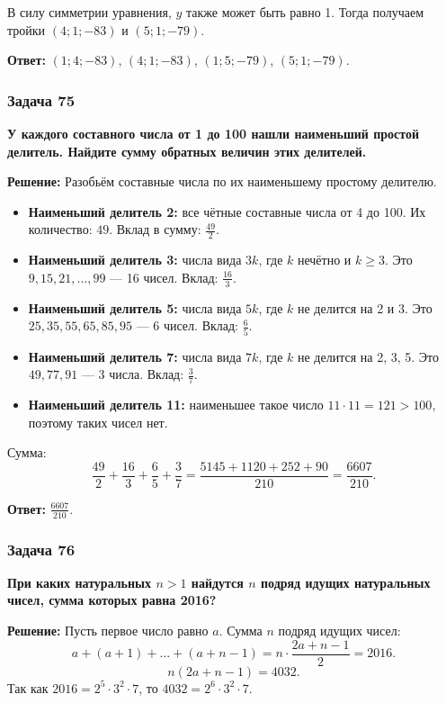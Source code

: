 \documentclass[12pt, a4paper]{article}
\begin{document}
В силу симметрии уравнения, $y$ также может быть равно 1. Тогда получаем тройки $(4; 1; -83)$ и $(5; 1; -79)$.

\textbf{Ответ:} $(1; 4; -83)$, $(4; 1; -83)$, $(1; 5; -79)$, $(5; 1; -79)$.

\subsubsection*{Задача 75}
\textbf{У каждого составного числа от 1 до 100 нашли наименьший простой делитель. Найдите сумму обратных величин этих делителей.}

\textbf{Решение:}
Разобьём составные числа по их наименьшему простому делителю.

\begin{itemize}
    \item \textbf{Наименьший делитель 2:} все чётные составные числа от 4 до 100. Их количество: $49$. Вклад в сумму: $\frac{49}{2}$.
    \item \textbf{Наименьший делитель 3:} числа вида $3k$, где $k$ нечётно и $k \ge 3$. Это $9, 15, 21, \ldots, 99$ — 16 чисел. Вклад: $\frac{16}{3}$.
    \item \textbf{Наименьший делитель 5:} числа вида $5k$, где $k$ не делится на 2 и 3. Это $25, 35, 55, 65, 85, 95$ — 6 чисел. Вклад: $\frac{6}{5}$.
    \item \textbf{Наименьший делитель 7:} числа вида $7k$, где $k$ не делится на 2, 3, 5. Это $49, 77, 91$ — 3 числа. Вклад: $\frac{3}{7}$.
    \item \textbf{Наименьший делитель 11:} наименьшее такое число $11 \cdot 11 = 121 > 100$, поэтому таких чисел нет.
\end{itemize}

Сумма:
\[
\frac{49}{2} + \frac{16}{3} + \frac{6}{5} + \frac{3}{7} = \frac{5145 + 1120 + 252 + 90}{210} = \frac{6607}{210}.
\]

\textbf{Ответ:} $\frac{6607}{210}$.

\subsubsection*{Задача 76}
\textbf{При каких натуральных $n > 1$ найдутся $n$ подряд идущих натуральных чисел, сумма которых равна 2016?}

\textbf{Решение:}
Пусть первое число равно $a$. Сумма $n$ подряд идущих чисел:
\[
a + (a+1) + \ldots + (a+n-1) = n \cdot \frac{2a + n - 1}{2} = 2016.
\]
\[
n(2a + n - 1) = 4032.
\]
Так как $2016 = 2^5 \cdot 3^2 \cdot 7$, то $4032 = 2^6 \cdot 3^2 \cdot 7$.
\end{document}
